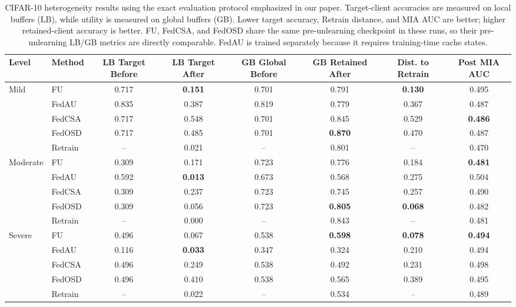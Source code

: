 \begin{table}[t]
\centering
\caption{CIFAR-10 heterogeneity results using the exact evaluation protocol emphasized in our paper. Target-client accuracies are measured on local buffers (LB), while utility is measured on global buffers (GB). Lower target accuracy, Retrain distance, and MIA AUC are better; higher retained-client accuracy is better. FU, FedCSA, and FedOSD share the same pre-unlearning checkpoint in these runs, so their pre-unlearning LB/GB metrics are directly comparable. FedAU is trained separately because it requires training-time cache states.}
\label{tab:lbgb_main_results}
\begin{tabular}{llcccccc}
\toprule
Level & Method & LB Target Before & LB Target After & GB Global Before & GB Retained After & Dist. to Retrain & Post MIA AUC \\
\midrule
Mild & FU & 0.717 & \textbf{0.151} & 0.701 & 0.791 & \textbf{0.130} & 0.495 \\
 & FedAU & 0.835 & 0.387 & 0.819 & 0.779 & 0.367 & 0.487 \\
 & FedCSA & 0.717 & 0.548 & 0.701 & 0.845 & 0.529 & \textbf{0.486} \\
 & FedOSD & 0.717 & 0.485 & 0.701 & \textbf{0.870} & 0.470 & 0.487 \\
 & Retrain & -- & 0.021 & -- & 0.801 & -- & 0.470 \\
\midrule
Moderate & FU & 0.309 & 0.171 & 0.723 & 0.776 & 0.184 & \textbf{0.481} \\
 & FedAU & 0.592 & \textbf{0.013} & 0.673 & 0.568 & 0.275 & 0.504 \\
 & FedCSA & 0.309 & 0.237 & 0.723 & 0.745 & 0.257 & 0.490 \\
 & FedOSD & 0.309 & 0.056 & 0.723 & \textbf{0.805} & \textbf{0.068} & 0.482 \\
 & Retrain & -- & 0.000 & -- & 0.843 & -- & 0.481 \\
\midrule
Severe & FU & 0.496 & 0.067 & 0.538 & \textbf{0.598} & \textbf{0.078} & \textbf{0.494} \\
 & FedAU & 0.116 & \textbf{0.033} & 0.347 & 0.324 & 0.210 & 0.494 \\
 & FedCSA & 0.496 & 0.249 & 0.538 & 0.492 & 0.231 & 0.498 \\
 & FedOSD & 0.496 & 0.410 & 0.538 & 0.565 & 0.389 & 0.495 \\
 & Retrain & -- & 0.022 & -- & 0.534 & -- & 0.489 \\
\bottomrule
\end{tabular}
\end{table}